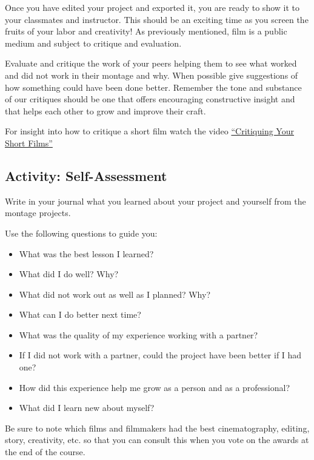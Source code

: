 \documentclass[
]{book}
\providecommand{\tightlist}{%
  \setlength{\itemsep}{0pt}\setlength{\parskip}{0pt}}
\begin{document}
\begin{reflect}
Once you have edited your project and exported it, you are ready to show it to your classmates and instructor. This should be an exciting time as you screen the fruits of your labor and creativity! As previously mentioned, film is a public medium and subject to critique and evaluation.

Evaluate and critique the work of your peers helping them to see what worked and did not work in their montage and why. When possible give suggestions of how something could have been done better. Remember the tone and substance of our critiques should be one that offers encouraging constructive insight and that helps each other to grow and improve their craft.

For insight into how to critique a short film watch the video \href{https://www.youtube.com/watch?v=x5ASDkOSIBE}{``Critiquing Your Short Films''}
\end{reflect}

\hypertarget{activity-self-assessment}{%
\subsection*{Activity: Self-Assessment}\label{activity-self-assessment}}

\begin{reflect}
Write in your journal what you learned about your project and yourself from the montage projects.

Use the following questions to guide you:

\begin{itemize}
\tightlist
\item
  What was the best lesson I learned?\\
\item
  What did I do well? Why?\\
\item
  What did not work out as well as I planned? Why?\\
\item
  What can I do better next time?\\
\item
  What was the quality of my experience working with a partner?\\
\item
  If I did not work with a partner, could the project have been better if I had one?\\
\item
  How did this experience help me grow as a person and as a professional?\\
\item
  What did I learn new about myself?
\end{itemize}

Be sure to note which films and filmmakers had the best cinematography, editing, story, creativity, etc. so that you can consult this when you vote on the awards at the end of the course.
\end{reflect}
\end{document}
